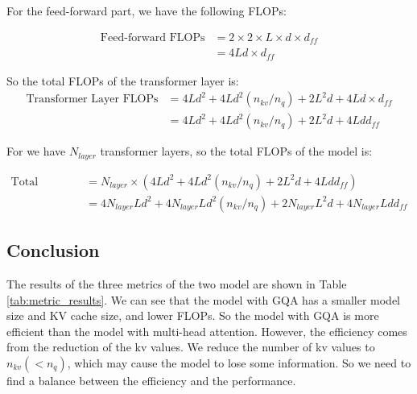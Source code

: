 \documentclass[a4paper,12pt]{article}
\begin{document}
For the feed-forward part, we have the following FLOPs:

\begin{align}
    \text{Feed-forward FLOPs} &= 2\times 2 \times L \times d \times d_{ff} \\
    &= 4Ld \times d_{ff}
\end{align}

So the total FLOPs of the transformer layer is:
\begin{align}
    \text{Transformer Layer FLOPs} &= 4Ld^2 + 4Ld^2(n_{kv}/n_q) + 2L^2d + 4Ld \times d_{ff} \\
    &= 4Ld^2 + 4Ld^2(n_{kv}/n_q) + 2L^2d + 4Ldd_{ff}
\end{align}

For we have $N_{layer}$ transformer layers, so the total FLOPs of the model is:

\begin{align}
    \text{Total FLOPs} &= N_{layer} \times (4Ld^2 + 4Ld^2(n_{kv}/n_q) + 2L^2d + 4Ldd_{ff}) \\
    &= 4N_{layer}Ld^2 + 4N_{layer}Ld^2(n_{kv}/n_q) + 2N_{layer}L^2d + 4N_{layer}Ldd_{ff}
\end{align}

\subsection{Conclusion}

The results of the three metrics of the two model are shown in Table \ref{tab:metric_results}. We can see that the model with GQA has a smaller model size and KV cache size, and lower FLOPs. So the model with GQA is more efficient than the model with multi-head attention. However, the efficiency comes from the reduction of the kv values. We reduce the number of kv values to $n_{kv}(<n_q)$, which may cause the model to lose some information. So we need to find a balance between the efficiency and the performance.
\begin{table}[H]
    \centering
    \caption{Results of the three metrics}
    \label{tab:metric_results}
\end{table}





\printbibliography[heading=bibintoc, title={References}]
\end{document}
